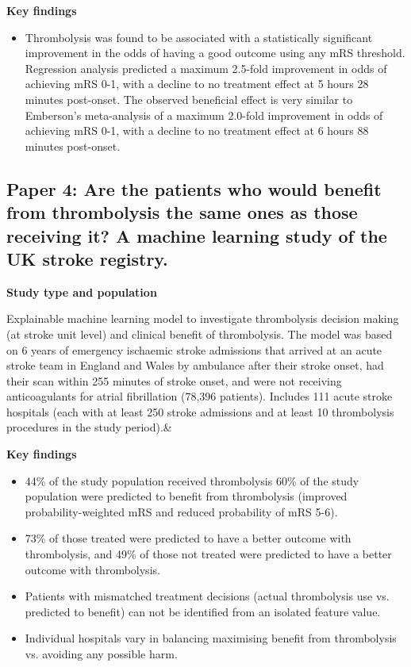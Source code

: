 \textbf{Key findings}

\begin{itemize}
    \item Thrombolysis was found to be associated with a statistically significant improvement in the odds of having a good outcome using any mRS threshold. Regression analysis predicted a maximum 2.5-fold improvement in odds of achieving mRS 0-1, with a decline to no treatment effect at 5 hours 28 minutes post-onset. The observed beneficial effect is very similar to Emberson’s meta-analysis of a maximum 2.0-fold improvement in odds of achieving mRS 0-1, with a decline to no treatment effect at 6 hours 88 minutes post-onset.
    
\end{itemize}

\subsection{Paper 4: Are the patients who would benefit from thrombolysis the same ones as those receiving it? A machine learning study of the UK stroke registry.\cite{pearn_are_2024}}

\textbf{Study type and population}

Explainable machine learning model to investigate thrombolysis decision making (at stroke unit level) and clinical benefit of thrombolysis. The model was based on 6 years of emergency ischaemic stroke admissions that arrived at an acute stroke team in England and Wales by ambulance after their stroke onset, had their scan within 255 minutes of stroke onset, and were not receiving anticoagulants for atrial fibrillation (78,396 patients). Includes 111 acute stroke hospitals (each with at least 250 stroke admissions and at least 10 thrombolysis procedures in the study period).&

\textbf{Key findings}

\begin{itemize}
    \item 44\% of the study population received thrombolysis 60\% of the study population were predicted to benefit from thrombolysis (improved probability-weighted mRS and reduced probability of mRS 5-6).
    
    \item 73\% of those treated were predicted to have a better outcome with thrombolysis, and 49\% of those not treated were predicted to have a better outcome with thrombolysis.
    
    \item Patients with mismatched treatment decisions (actual thrombolysis use vs. predicted to benefit) can not be identified from an isolated feature value. 
    \item Individual hospitals vary in balancing maximising benefit from thrombolysis vs. avoiding any possible harm.
\end{itemize}

